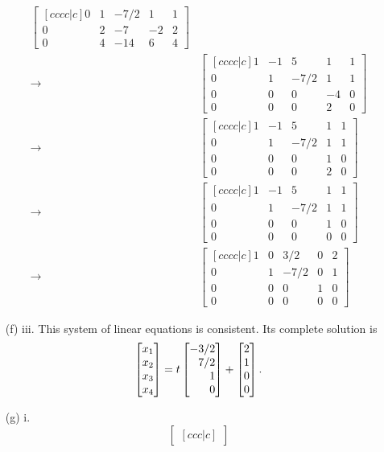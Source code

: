 \begin{exercises}
\begin{problist}
\begin{solution}
\begin{enumerate}
\begin{align*}
\begin{bmatrix}[cccc|c]
						0 & 1 & -7/2 & 1 & 1\\
						0 & 2 & -7 & -2 & 2\\
						0 & 4 & -14 & 6 & 4
					\end{bmatrix}\\
					\rightarrow
					&\begin{bmatrix}[cccc|c]
						1 & -1 & 5 & 1 & 1\\
						0 & 1 & -7/2 & 1 & 1\\
						0 & 0 & 0 & -4 & 0\\
						0 & 0 & 0 & 2 & 0
					\end{bmatrix}\\
					\rightarrow
					&\begin{bmatrix}[cccc|c]
						1 & -1 & 5 & 1 & 1\\
						0 & 1 & -7/2 & 1 & 1\\
						0 & 0 & 0 & 1 & 0\\
						0 & 0 & 0 & 2 & 0
					\end{bmatrix}\\
					\rightarrow
					&\begin{bmatrix}[cccc|c]
						1 & -1 & 5 & 1 & 1\\
						0 & 1 & -7/2 & 1 & 1\\
						0 & 0 & 0 & 1 & 0\\
						0 & 0 & 0 & 0 & 0
					\end{bmatrix}\\
					\rightarrow
					&\begin{bmatrix}[cccc|c]
						1 & 0 & 3/2 & 0 & 2\\
						0 & 1 & -7/2 & 0 & 1\\
						0 & 0 & 0 & 1 & 0\\
						0 & 0 & 0 & 0 & 0
					\end{bmatrix}
				\end{align*}
				\item[(f) iii.]
				This system of linear equations is consistent. Its complete solution is
				\[
					\mat{x_1\\x_2\\x_3\\x_4}=t\mat{-3/2\\7/2\\1\\0}+\mat{2\\1\\0\\0}.
				\]
				\item[(g) i.]
				\[
					\begin{bmatrix}[ccc|c]

\end{bmatrix}\]
\end{enumerate}
\end{solution}
\end{problist}
\end{exercises}
